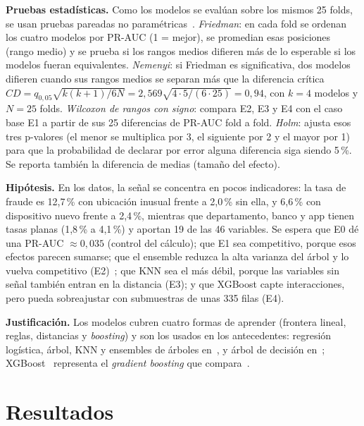 \documentclass[conference,a4paper]{IEEEtran}
\begin{document}
\textbf{Pruebas estadísticas.} Como los modelos se evalúan sobre los mismos 25 folds, se usan
pruebas pareadas no paramétricas~\cite{demsar2006}. \emph{Friedman}: en cada fold se ordenan
los cuatro modelos por PR-AUC (1 = mejor), se promedian esas posiciones (rango medio) y se
prueba si los rangos medios difieren más de lo esperable si los modelos fueran equivalentes.
\emph{Nemenyi}: si Friedman es significativa, dos modelos difieren cuando sus rangos medios se
separan más que la diferencia crítica
$CD = q_{0{,}05}\sqrt{k(k+1)/6N} = 2{,}569\sqrt{4\cdot5/(6\cdot25)} = 0{,}94$, con $k=4$
modelos y $N=25$ folds. \emph{Wilcoxon de rangos con signo}: compara E2, E3 y E4 con el caso
base E1 a partir de sus 25 diferencias de PR-AUC fold a fold. \emph{Holm}: ajusta esos tres
p-valores (el menor se multiplica por 3, el siguiente por 2 y el mayor por 1) para que la
probabilidad de declarar por error alguna diferencia siga siendo 5\,\%. Se reporta también la diferencia de medias (tamaño del efecto).

\textbf{Hipótesis.} En los datos, la señal se concentra en pocos indicadores: la tasa de fraude
es 12,7\,\% con ubicación inusual frente a 2,0\,\% sin ella, y 6,6\,\% con dispositivo nuevo
frente a 2,4\,\%, mientras que departamento, banco y app tienen tasas planas (1,8\,\% a
4,1\,\%) y aportan 19 de las 46 variables. Se espera que E0 dé una PR-AUC $\approx 0{,}035$
(control del cálculo); que E1 sea competitivo, porque esos efectos parecen sumarse; que el
ensemble reduzca la alta varianza del árbol y lo vuelva competitivo (E2)~\cite{breiman1996};
que KNN sea el más débil, porque las variables sin señal también entran en la distancia (E3); y
que XGBoost capte interacciones, pero pueda sobreajustar con submuestras de unas 335 filas (E4).

\textbf{Justificación.} Los modelos cubren cuatro formas de aprender (frontera lineal,
reglas, distancias y \emph{boosting}) y son los usados en los antecedentes: regresión
logística, árbol, KNN y ensembles de árboles en~\cite{modi02,anahitapouladi,nusraatmili}, y
árbol de decisión en~\cite{rugeles2025}; XGBoost~\cite{chen2016} representa el
\emph{gradient boosting} que compara~\cite{modi02}.

\section{Resultados}\label{sec:resultados}
\end{document}
